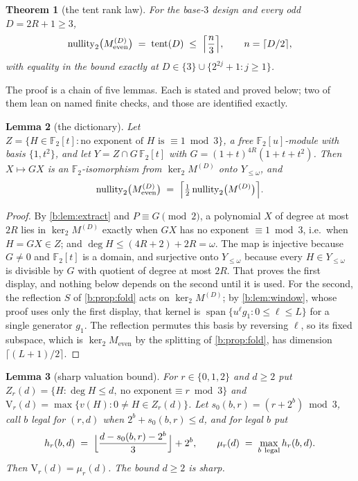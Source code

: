 \documentclass[11pt]{amsart}
\newtheorem{theorem}{Theorem}[section]
\newtheorem{lemma}[theorem]{Lemma}
\theoremstyle{definition}
\theoremstyle{remark}
\begin{document}
\begin{theorem}[the tent rank law]
\label{b:thm:tent}
For the base-$3$ design and every odd $D = 2R+1 \ge 3$,
\[
  \operatorname{nullity}_2\bigl(M_{\mathrm{even}}^{(D)}\bigr) \;=\; \operatorname{tent}(D) \;\le\; \Bigl\lceil \frac{n}{3} \Bigr\rceil,
  \qquad n = \lceil D/2 \rceil,
\]
with equality in the bound exactly at $D \in \{3\} \cup \{2^{2j}+1 : j \ge 1\}$.
\end{theorem}

The proof is a chain of five lemmas. Each is stated and proved below; two of them lean on named finite checks, and those are identified exactly.

\begin{lemma}[the dictionary]
\label{b:lem:dict}
Let $Z = \{H \in \mathbb{F}_2[t] : \text{no exponent of } H \text{ is } \equiv 1 \bmod 3\}$, a free $\mathbb{F}_2[u]$-module with basis $\{1, t^2\}$, and let $Y = Z \cap G\,\mathbb{F}_2[t]$ with $G = (1+t)^{4R}(1+t+t^2)$. Then $X \mapsto GX$ is an $\mathbb{F}_2$-isomorphism from $\ker_2 M^{(D)}$ onto $Y_{\le \omega}$, and
\[
  \operatorname{nullity}_2\bigl(M_{\mathrm{even}}^{(D)}\bigr) \;=\; \Bigl\lceil \tfrac{1}{2} \operatorname{nullity}_2\bigl(M^{(D)}\bigr) \Bigr\rceil .
\]
\end{lemma}

\begin{proof}
By \cref{b:lem:extract} and $P \equiv G \pmod 2$, a polynomial $X$ of degree at most $2R$ lies in $\ker_2 M^{(D)}$ exactly when $GX$ has no exponent $\equiv 1 \bmod 3$, i.e.\ when $H = GX \in Z$; and $\deg H \le (4R+2) + 2R = \omega$. The map is injective because $G \ne 0$ and $\mathbb{F}_2[t]$ is a domain, and surjective onto $Y_{\le \omega}$ because every $H \in Y_{\le \omega}$ is divisible by $G$ with quotient of degree at most $2R$. That proves the first display, and nothing below depends on the second until it is used. For the second, the reflection $S$ of \cref{b:prop:fold} acts on $\ker_2 M^{(D)}$; by \cref{b:lem:window}, whose proof uses only the first display, that kernel is $\operatorname{span}\{u^\ell g_1 : 0 \le \ell \le L\}$ for a single generator $g_1$. The reflection permutes this basis by reversing $\ell$, so its fixed subspace, which is $\ker_2 M_{\mathrm{even}}$ by the splitting of \cref{b:prop:fold}, has dimension $\lceil (L+1)/2 \rceil$.
\end{proof}

\begin{lemma}[sharp valuation bound]
\label{b:lem:M}
For $r \in \{0,1,2\}$ and $d \ge 2$ put $Z_r(d) = \{H : \deg H \le d,\ \text{no exponent} \equiv r \bmod 3\}$ and $\mathrm{V}_r(d) = \max\{v(H) : 0 \ne H \in Z_r(d)\}$. Let $s_0(b,r) = (r + 2^b) \bmod 3$, call $b$ \emph{legal} for $(r,d)$ when $2^b + s_0(b,r) \le d$, and for legal $b$ put
\[
  h_r(b,d) \;=\; \Bigl\lfloor \frac{d - s_0(b,r) - 2^b}{3} \Bigr\rfloor + 2^b,
  \qquad
  \mu_r(d) \;=\; \max_{b\ \mathrm{legal}} h_r(b,d).
\]
Then $\mathrm{V}_r(d) = \mu_r(d)$. The bound $d \ge 2$ is sharp.
\end{lemma}
\end{document}
